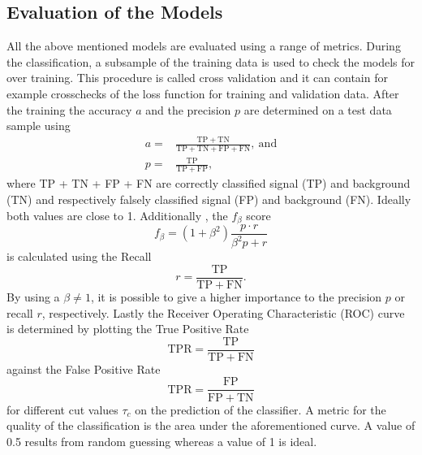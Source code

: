 \subsection{Evaluation of the Models}
All the above mentioned models are evaluated using a range of metrics. During the classification, a subsample of the training data is used to check the models for over training. This procedure is called cross validation and it can contain for example crosschecks of the loss function for training and validation data. After the training the accuracy $a$ and the precision $p$ are determined on a test data sample using 
\begin{align*}
	a =& \frac{\mathrm{TP + TN}}{\mathrm{TP + TN + FP + FN}},\ \mathrm{and}\\
	p=&  \frac{\mathrm{TP}}{\mathrm{TP + FP}},
\end{align*}
where TP + TN + FP + FN are correctly classified signal (TP) and background (TN) and respectively falsely classified signal (FP) and background (FN). Ideally both values are close to 1. 
Additionally , the $f_\beta$ score
\begin{equation}
	f_\beta = (1+\beta^2) \frac{p\cdot r}{\beta^2p+r}
\end{equation}
is calculated using the Recall
\begin{equation*}
r = \frac{\mathrm{TP}}{\mathrm{TP + FN}}.
\end{equation*}
By using a $\beta \neq 1$, it is possible to give a higher importance to the precision $p$ or recall $r$, respectively.
Lastly the Receiver Operating Characteristic (ROC) curve is determined by plotting the True Positive Rate 
\begin{equation*}
	\mathrm{TPR} = \frac{\mathrm{TP}}{\mathrm{TP + FN}}
\end{equation*}
against the False Positive Rate 
\begin{equation*}
	\mathrm{TPR} = \frac{\mathrm{FP}}{\mathrm{FP + TN}}
\end{equation*}
for different cut values $\tau_c$ on the prediction of the classifier. A metric for the quality of the classification is the area under the aforementioned curve. A value of 0.5 results from random guessing whereas a value of 1 is ideal.









